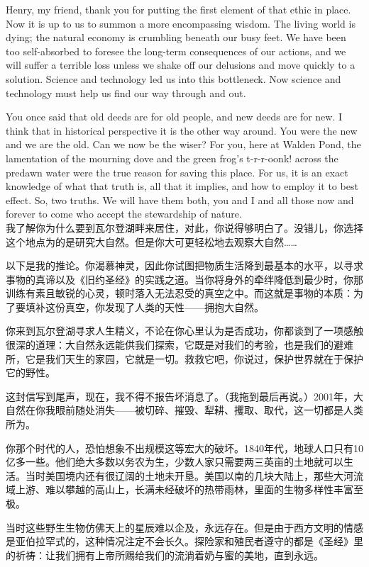 { Henry, my friend, thank you for putting the first element of that ethic in place. Now it is up to us to summon a more encompassing wisdom. The living world is dying; the natural economy is crumbling beneath our busy feet. We have been too self-absorbed to foresee the long-term consequences of our actions, and we will suffer a terrible loss unless we shake off our delusions and move quickly to a solution. Science and technology led us into this bottleneck. Now science and technology must help us find our way through and out.
 
 You once said that old deeds are for old people, and new deeds are for new. I think that in historical perspective it is the other way around. You were the new and we are the old. Can we now be the wiser? For you, here at Walden Pond, the lamentation of the mourning dove and the green frog’s t-r-r-oonk! across the predawn water were the true reason for saving this place. For us, it is an exact knowledge of what that truth is, all that it implies, and how to employ it to best effect. So, two truths. We will have them both, you and I and all those now and forever to come who accept the stewardship of nature.
\\

 我了解你为什么要到瓦尔登湖畔来居住，对此，你说得够明白了。没错儿，你选择这个地点为的是研究大自然。但是你大可更轻松地去观察大自然……
 
 以下是我的推论。你渴慕神灵，因此你试图把物质生活降到最基本的水平，以寻求事物的真谛以及《旧约圣经》的实践之道。当你将身外的牵绊降低到最少时，你那训练有素且敏锐的心灵，顿时落入无法忍受的真空之中。而这就是事物的本质：为了要填补这份真空，你发现了人类的天性——拥抱大自然。
 
 你来到瓦尔登湖寻求人生精义，不论在你心里认为是否成功，你都谈到了一项感触很深的道理：大自然永远能供我们探索，它既是对我们的考验，也是我们的避难所，它是我们天生的家园，它就是一切。救救它吧，你说过，保护世界就在于保护它的野性。
 
 这封信写到尾声，现在，我不得不报告坏消息了。（我拖到最后再说。）2001年，大自然在你我眼前随处消失——被切碎、摧毁、犁耕、攫取、取代，这一切都是人类所为。
 
 你那个时代的人，恐怕想象不出规模这等宏大的破坏。1840年代，地球人口只有10亿多一些。他们绝大多数以务农为生，少数人家只需要两三英亩的土地就可以生活。当时美国境内还有很辽阔的土地未开垦。美国以南的几块大陆上，那些大河流域上游、难以攀越的高山上，长满未经破坏的热带雨林，里面的生物多样性丰富至极。
 
 当时这些野生生物仿佛天上的星辰难以企及，永远存在。但是由于西方文明的情感是亚伯拉罕式的，这种情况注定不会长久。探险家和殖民者遵守的都是《圣经》里的祈祷：让我们拥有上帝所赐给我们的流淌着奶与蜜的美地，直到永远。
 
}
